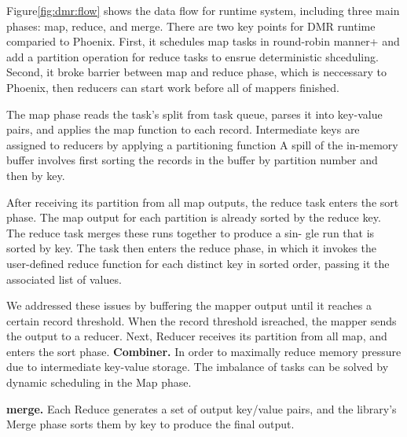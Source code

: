 Figure\ref{fig:dmr:flow} shows the data flow for 
\myds runtime system, 
including three main phases: map, reduce, and merge.
There are two key points for DMR runtime comparied to Phoenix.
First, it schedules map tasks in round-robin manner+
and add a partition operation for reduce tasks 
to ensrue deterministic shceduling.
Second, it broke barrier between map and reduce phase,
which is neccessary to Phoenix,
then reducers can start work before all of mappers finished.

The map phase reads the task’s split from task queue,
parses it into key-value pairs, and applies
the map function to each record.
Intermediate keys are assigned
to reducers by applying a partitioning function
A spill of the in-memory buffer involves first sorting
the records in the buffer by partition number and then by
key.

After receiving its partition from all map outputs, the
reduce task enters the sort phase. The map output for
each partition is already sorted by the reduce key. The
reduce task merges these runs together to produce a sin-
gle run that is sorted by key. The task then enters the
reduce phase, in which it invokes the user-defined reduce
function for each distinct key in sorted order, passing it
the associated list of values.

We addressed these issues by buffering the mapper output until
it reaches a certain record threshold.
When the record threshold isreached, 
the mapper sends the output to a reducer. 
Next, Reducer receives its partition from all map, 
and enters the sort phase.
{\bf Combiner.}
In order to maximally reduce memory pressure due to intermediate key-value
storage.%
The imbalance of tasks can be solved by dynamic scheduling in the Map phase. 

{\bf merge.}
Each Reduce generates a set of output key/value
pairs, and the library’s Merge phase sorts them by key to
produce the final output. 

